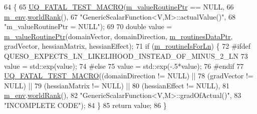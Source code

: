 \begin{DoxyCode}
64 \{
65   \hyperlink{_defines_8h_a56d63d18d0a6d45757de47fcc06f574d}{UQ\_FATAL\_TEST\_MACRO}(\hyperlink{class_q_u_e_s_o_1_1_generic_scalar_function_a9feaa5ee6ceb321fde56c5dd4dc48f2f}{m\_valueRoutinePtr} == NULL,
66                       \hyperlink{class_q_u_e_s_o_1_1_base_scalar_function_adf44141aeb765d97613286f88f235f04}{m\_env}.\hyperlink{class_q_u_e_s_o_1_1_base_environment_a78b57112bbd0e6dd0e8afec00b40ffa7}{worldRank}(),
67                       \textcolor{stringliteral}{"GenericScalarFunction<V,M>::actualValue()"},
68                       \textcolor{stringliteral}{"m\_valueRoutinePtr = NULL"});
69 
70   \textcolor{keywordtype}{double} value = \hyperlink{class_q_u_e_s_o_1_1_generic_scalar_function_a9feaa5ee6ceb321fde56c5dd4dc48f2f}{m\_valueRoutinePtr}(domainVector, domainDirection, 
      \hyperlink{class_q_u_e_s_o_1_1_generic_scalar_function_a46b2964caebcd2e22f913f86798bdf36}{m\_routinesDataPtr}, gradVector, hessianMatrix, hessianEffect);
71   \textcolor{keywordflow}{if} (\hyperlink{class_q_u_e_s_o_1_1_generic_scalar_function_a22e044d791d578453734356587bd7e65}{m\_routineIsForLn}) \{
72 \textcolor{preprocessor}{#ifdef QUESO\_EXPECTS\_LN\_LIKELIHOOD\_INSTEAD\_OF\_MINUS\_2\_LN}
73 \textcolor{preprocessor}{}    value = std::exp(value);
74 \textcolor{preprocessor}{#else}
75 \textcolor{preprocessor}{}    value = std::exp(-.5*value);
76 \textcolor{preprocessor}{#endif}
77 \textcolor{preprocessor}{}    \hyperlink{_defines_8h_a56d63d18d0a6d45757de47fcc06f574d}{UQ\_FATAL\_TEST\_MACRO}((domainDirection != NULL) ||
78                         (gradVector      != NULL) ||
79                         (hessianMatrix   != NULL) ||
80                         (hessianEffect   != NULL),
81                         \hyperlink{class_q_u_e_s_o_1_1_base_scalar_function_adf44141aeb765d97613286f88f235f04}{m\_env}.\hyperlink{class_q_u_e_s_o_1_1_base_environment_a78b57112bbd0e6dd0e8afec00b40ffa7}{worldRank}(),
82                         \textcolor{stringliteral}{"GenericScalarFunction<V,M>::gradOfActual()"},
83                         \textcolor{stringliteral}{"INCOMPLETE CODE"});
84   \}
85   \textcolor{keywordflow}{return} value;
86 \}
\end{DoxyCode}
